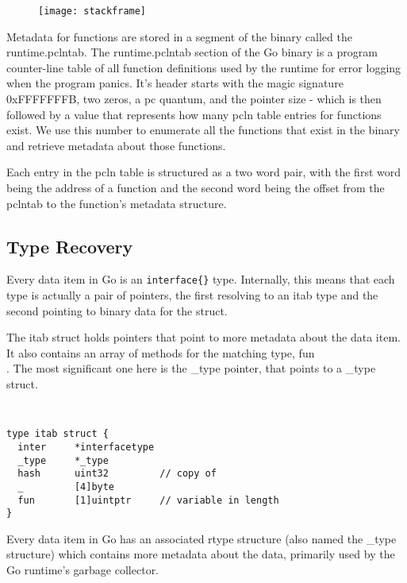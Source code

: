 \documentclass[letterpaper,twocolumn,10pt]{article}
\begin{document}
\begin{figure}[h]
\texttt{[image: stackframe]}
\end{figure}

%

Metadata for functions are stored in a segment of the binary called the runtime.pclntab. The runtime.pclntab section of the Go binary is a program counter-line table of all function definitions used by the runtime for error logging when the program panics. It’s header starts with the magic signature 0xFFFFFFFB, two zeros, a pc quantum, and the pointer size - which is then followed by a value that represents how many pcln table entries for functions exist. We use this number to enumerate all the functions that exist in the binary and retrieve metadata about those functions.

Each entry in the pcln table is structured as a two word pair, with the first word being the address of a function and the second word being the offset from the pclntab to the function’s metadata structure.

\subsection{Type Recovery}
Every data item in Go is an \texttt{interface\{\}} type. Internally, this means that each type is actually a pair of pointers, the first resolving to an itab type and the second pointing to binary data for the struct.

    The itab struct holds pointers that point to more metadata about the data item. It also contains an array of methods for the matching type, fun\[\]. The most significant one here is the \_type pointer, that points to a \_type struct.

{\tt \small
\begin{verbatim}
type itab struct {
  inter     *interfacetype
  _type     *_type
  hash      uint32         // copy of
  _         [4]byte
  fun       [1]uintptr     // variable in length
}
\end{verbatim}
}

Every data item in Go has an associated rtype structure (also named the \_type structure) which contains more metadata about the data, primarily used by the Go runtime’s garbage collector.
\end{document}
